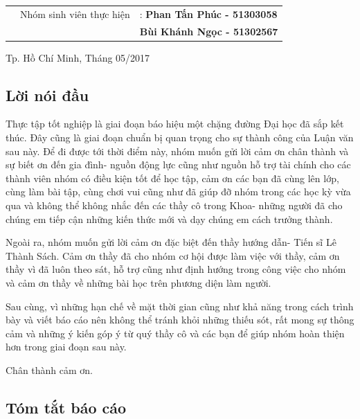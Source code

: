 \documentclass[a4paper,12pt]{article}
\begin{document}
\begin{titlepage}
\begin{table}[h]
\begin{tabular}{rrl}
				\vspace{0.5cm}
				\hspace{1.5 cm} & Nhóm sinh viên thực hiện & : \bf{Phan Tấn Phúc - 51303058}\\
				\hspace{1.5 cm} & \hspace{5 cm} &  \hspace{0.15cm} \bf{Bùi Khánh Ngọc - 51302567}\\
				
			\end{tabular}
		\end{table}
		\vspace{2cm}
		\begin{center}
			{\footnotesize Tp. Hồ Chí Minh, Tháng 05/2017}
		\end{center}
	\end{titlepage}
	\newpage
	\subsection*{Lời nói đầu}
	
	Thực tập tốt nghiệp là giai đoạn báo hiệu một chặng đường Đại học đã sắp kết thúc. Đây cũng là giai đoạn chuẩn bị quan trọng cho sự thành công của Luận văn sau này. Để đi được tới thời điểm này, nhóm muốn gửi lời cảm ơn chân thành và sự biết ơn đến gia đình- nguồn động lực cũng như nguồn hỗ trợ tài chính cho các thành viên nhóm có điều kiện tốt để học tập, cảm ơn các bạn đã cùng lên lớp, cùng làm bài tập, cùng chơi vui cũng như đã giúp đỡ nhóm trong các học kỳ vừa qua và không thể không nhắc đến các thầy cô trong Khoa- những người đã cho chúng em tiếp cận những kiến thức mới và dạy chúng em cách trưởng thành.
	
	Ngoài ra, nhóm muốn gửi lời cảm ơn đặc biệt đến thầy hướng dẫn- Tiến sĩ Lê Thành Sách. Cảm ơn thầy đã cho nhóm cơ hội được làm việc với thầy, cảm ơn thầy vì đã luôn theo sát, hỗ trợ cũng như định hướng trong công việc cho nhóm và cảm ơn thầy về những bài học trên phương diện làm người. 
	
	Sau cùng, vì những hạn chế về mặt thời gian cũng như khả năng trong cách trình bày và viết báo cáo nên không thể tránh khỏi những thiếu sót, rất mong sự thông cảm và những ý kiến góp ý từ quý thầy cô và các bạn để giúp nhóm hoàn thiện hơn trong giai đoạn sau này.
	
	Chân thành cảm ơn.
	
	\newpage
	\subsection*{Tóm tắt báo cáo}
	
\end{document}
